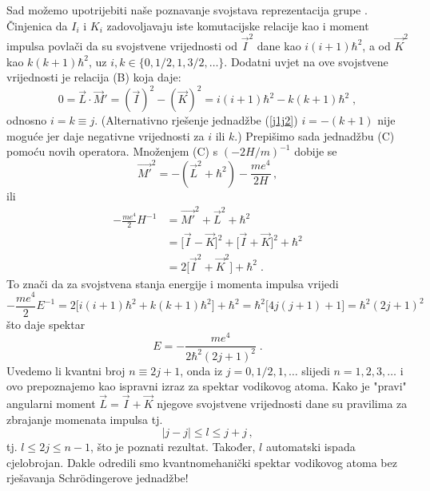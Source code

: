 Sad možemo upotrijebiti naše poznavanje svojstava reprezentacija
grupe . Činjenica da $I_i$ i $K_i$ zadovoljavaju
iste komutacijske relacije kao i moment impulsa povlači da
su svojstvene vrijednosti od $\vec{I}^2$ dane kao $i(i+1)\hbar^2$,
a od $\vec{K}^2$ kao $k(k+1)\hbar^2$, uz $i, k \in \{ 0, 1/2, 1, 3/2, \ldots\}$.
Dodatni uvjet na ove svojstvene vrijednosti je relacija (B) koja
daje:
\begin{equation}
0 = \vec{L}\cdot\vec{M}' = (\vec{I})^2 - (\vec{K})^2
  = i(i +1)\hbar^2 - k(k +1)\hbar^2 \;,
\label{j1j2}
\end{equation}
odnosno $i = k\equiv j$. (Alternativno rješenje jednadžbe (\ref{j1j2})
$i = - (k +1 )$ nije moguće jer daje negativne vrijednosti
za $i$ ili $k$.)
Prepišimo sada jednadžbu (C) pomoću novih operatora. Množenjem (C)
s $(-2H/m)^{-1}$ dobije se
\begin{equation}
   \vec{M'}^2 = -(\vec{L}^2 + \hbar^2) - \frac{me^4}{2H} \,,
\end{equation}
ili
\begin{align}
 -\frac{me^4}{2}H^{-1} &= \vec{M'}^{2} + \vec{L}^2 + \hbar^2 \\
&=\big[\vec{I} - \vec{K}\big]^2 + 
\big[\vec{I} + \vec{K}\big]^2  + \hbar^2\\
&=2\big[\vec{I}^2 + \vec{K}^2 \big] + \hbar^2  \;.
\end{align}
To znači da za svojstvena stanja energije i momenta impulsa vrijedi
\begin{equation}
-\frac{me^4}{2}E^{-1} = 2\big[i(i +1)\hbar^2 + k(k+1)\hbar^2 
\big] + \hbar^2   = \hbar^2 \big[ 4j(j+1) +1 \big] = \hbar^2 (2j+1)^2
\end{equation}
što daje spektar
\begin{equation}
   E = - \frac{m e^4}{2\hbar^2 (2j+1)^2} \;.
\end{equation}
Uvedemo li kvantni broj $n\equiv 2j+1$, onda iz $j=0,1/2, 1,\ldots$
slijedi $n=1,2,3,\ldots$ i ovo prepoznajemo kao ispravni izraz
za spektar vodikovog atoma.
Kako je "pravi" angularni moment $\vec{L}=\vec{I} +
\vec{K}$ njegove svojstvene vrijednosti dane su pravilima
za zbrajanje momenata impulsa tj.
\begin{equation}
    |j - j| \leq l \leq j + j \,,
\end{equation}
tj. $l \leq 2j \leq n-1$, što je poznati rezultat. Također, $l$
automatski ispada cjelobrojan. Dakle odredili smo kvantnomehanički spektar
vodikovog atoma bez rješavanja Schr\"{o}dingerove jednadžbe!


